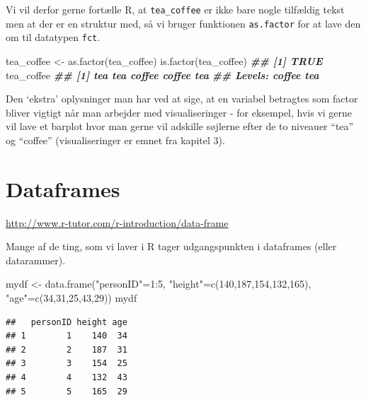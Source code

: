 \documentclass[
]{book}
\newenvironment{Shaded}{\begin{snugshade}}{\end{snugshade}}
\newcommand{\DecValTok}[1]{\textcolor[rgb]{0.00,0.00,0.81}{#1}}
\newcommand{\DocumentationTok}[1]{\textcolor[rgb]{0.56,0.35,0.01}{\textbf{\textit{#1}}}}
\newcommand{\FunctionTok}[1]{\textcolor[rgb]{0.00,0.00,0.00}{#1}}
\newcommand{\NormalTok}[1]{#1}
\newcommand{\OtherTok}[1]{\textcolor[rgb]{0.56,0.35,0.01}{#1}}
\newcommand{\SpecialCharTok}[1]{\textcolor[rgb]{0.00,0.00,0.00}{#1}}
\newcommand{\StringTok}[1]{\textcolor[rgb]{0.31,0.60,0.02}{#1}}
\begin{document}
Vi vil derfor gerne fortælle R, at \texttt{tea\_coffee} er ikke bare nogle tilfældig tekst men at der er en struktur med, så vi bruger funktionen \texttt{as.factor} for at lave den om til datatypen \texttt{fct}.

\begin{Shaded}
\begin{Highlighting}[]
\NormalTok{tea\_coffee }\OtherTok{\textless{}{-}} \FunctionTok{as.factor}\NormalTok{(tea\_coffee)}
\FunctionTok{is.factor}\NormalTok{(tea\_coffee)}
\DocumentationTok{\#\# [1] TRUE}
\NormalTok{tea\_coffee}
\DocumentationTok{\#\# [1] tea    tea    coffee coffee tea   }
\DocumentationTok{\#\# Levels: coffee tea}
\end{Highlighting}
\end{Shaded}

Den `ekstra' oplysninger man har ved at sige, at en variabel betragtes som factor bliver vigtigt når man arbejder med visualiseringer - for eksempel, hvis vi gerne vil lave et barplot hvor man gerne vil adskille søjlerne efter de to niveauer ``tea'' og ``coffee'' (visualiseringer er emnet fra kapitel 3).

\hypertarget{dataframes}{%
\section{Dataframes}\label{dataframes}}

\url{http://www.r-tutor.com/r-introduction/data-frame}

Mange af de ting, som vi laver i R tager udgangspunkten i dataframes (eller datarammer).

\begin{Shaded}
\begin{Highlighting}[]
\NormalTok{mydf }\OtherTok{\textless{}{-}} \FunctionTok{data.frame}\NormalTok{(}\StringTok{"personID"}\OtherTok{=}\DecValTok{1}\SpecialCharTok{:}\DecValTok{5}\NormalTok{, }\StringTok{"height"}\OtherTok{=}\FunctionTok{c}\NormalTok{(}\DecValTok{140}\NormalTok{,}\DecValTok{187}\NormalTok{,}\DecValTok{154}\NormalTok{,}\DecValTok{132}\NormalTok{,}\DecValTok{165}\NormalTok{), }\StringTok{"age"}\OtherTok{=}\FunctionTok{c}\NormalTok{(}\DecValTok{34}\NormalTok{,}\DecValTok{31}\NormalTok{,}\DecValTok{25}\NormalTok{,}\DecValTok{43}\NormalTok{,}\DecValTok{29}\NormalTok{))}
\NormalTok{mydf}
\end{Highlighting}
\end{Shaded}

\begin{verbatim}
##   personID height age
## 1        1    140  34
## 2        2    187  31
## 3        3    154  25
## 4        4    132  43
## 5        5    165  29
\end{verbatim}
\end{document}
